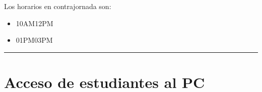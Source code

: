 \documentclass[letterpaper,10pt,spanish]{sphinxmanual}
\begin{document}
\sphinxAtStartPar
Los horarios en contrajornada son:
\begin{itemize}
\item {} 
\sphinxAtStartPar
{} 10AM\sphinxhyphen{}12PM

\item {} 
\sphinxAtStartPar
{} 01PM\sphinxhyphen{}03PM

\end{itemize}


\bigskip\hrule\bigskip



\section{Acceso de estudiantes al PC}
\label{\detokenize{0_intro/informacion:acceso-de-estudiantes-al-pc}}
\end{document}
